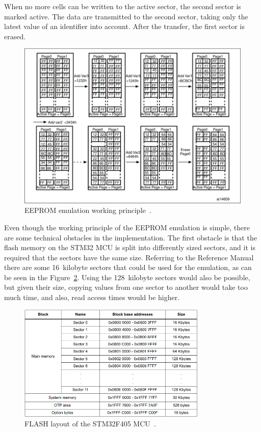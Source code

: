 When no more cells can be written to the active sector, the second sector is marked active.
The data are transmitted to the second sector, taking only the latest value of an identifier into account.
After the transfer, the first sector is erased.

\begin{figure}[H]
    \centering
    \includegraphics[width=\textwidth]{obrazky/eeprom_emul_principle}
    \caption{EEPROM emulation working principle~\cite{stmicro_an3969_2011}.}
    \label{fig:eeprom_emul}
\end{figure}

Even though the working principle of the EEPROM emulation is simple, there are some technical obstacles in the implementation.
The first obstacle is that the flash memory on the STM32 MCU is split into differently sized sectors, and it is required that the sectors have the same size.
Referring to the Reference Manual~\cite{stmicro_stm32f405rg_nodate} there are some 16~kilobyte sectors that could be used for the emulation, as can be seen in the Figure~\ref{fig:flash_layout}.
Using the 128~kilobyte sectors would also be possible, but given their size, copying values from one sector to another would take too much time, and also, read access times would be higher.

\begin{figure}[H]
    \centering
    \includegraphics[width=0.8\textwidth]{obrazky/flash_stm}
    \caption{FLASH layout of the STM32F405 MCU~\cite{stmicro_stm32f405rg_nodate}.}
    \label{fig:flash_layout}
\end{figure}

